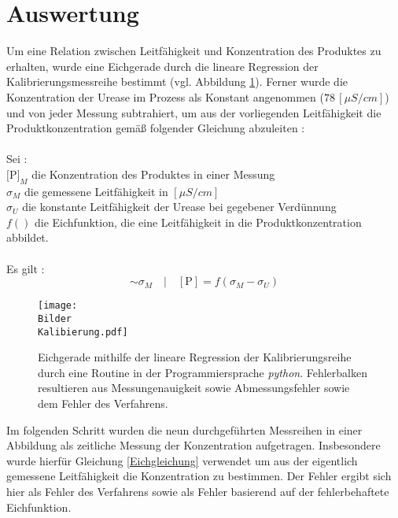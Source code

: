 %
%
\setlength\abovedisplayshortskip{20pt}
\setlength\belowdisplayshortskip{20pt}
\setlength\abovedisplayskip{20pt}
\setlength\belowdisplayskip{20pt}
\section {Auswertung}
Um eine Relation zwischen Leitfähigkeit und Konzentration des Produktes zu erhalten, wurde eine Eichgerade durch die lineare Regression der Kalibrierungsmessreihe bestimmt (vgl. Abbildung \ref{Eichgerade}). Ferner wurde die Konzentration der Urease im Prozess als Konstant angenommen ($ 78\,[\si{\mu S/cm}]$) und von jeder Messung subtrahiert, um aus der vorliegenden Leitfähigkeit die Produktkonzentration gemäß folgender Gleichung abzuleiten : \\
\\
Sei : \\
 $[$P$]_M$ die Konzentration des Produktes in einer Messung\\
 $\sigma_M$ die gemessene Leitfähigkeit in $[\si{\mu S/cm}]$\\
  $\sigma_U$ die konstante Leitfähigkeit der Urease bei gegebener Verdünnung \\
  $f()$ die Eichfunktion, die eine Leitfähigkeit in die Produktkonzentration abbildet.\\
  \\
  Es gilt :
\begin{equation}
[\text{P}]  \sim \sigma_M \quad| \quad [\text{P}]=f(\sigma_M-\sigma_U)
\label{Eichgleichung}
\end{equation}
\begin{figure}[H]
	\centering	
	\begin{minipage}{1\textwidth}
		\texttt{[image: \\Bilder\\Kalibierung.pdf]}
	\end{minipage}
	\caption{Eichgerade mithilfe der lineare Regression der Kalibrierungsreihe durch eine Routine in der Programmiersprache \textit{python}. Fehlerbalken resultieren aus Messungenauigkeit sowie Abmessungsfehler sowie dem Fehler des Verfahrens.}
	\label{Eichgerade}
\end{figure}
Im folgenden Schritt wurden die neun durchgeführten Messreihen in einer Abbildung als zeitliche Messung der Konzentration aufgetragen. Insbesondere wurde hierfür Gleichung \ref{Eichgleichung} verwendet um aus der eigentlich gemessene Leitfähigkeit die Konzentration zu bestimmen. Der Fehler ergibt sich hier als Fehler des Verfahrens sowie als Fehler basierend auf der fehlerbehaftete Eichfunktion.
